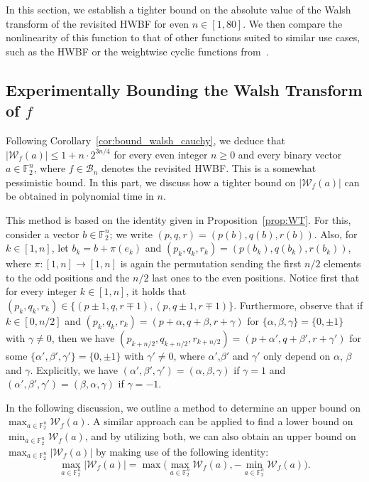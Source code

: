 \documentclass[runningheads,orivec]{llncs}
\newcommand{\BN}{\mathcal{B}_n}
\newcommand{\F}{\mathbb{F}}
\newcommand{\hwbf}{\textsf{HWBF}}
\newcommand{\wt}[1]{\mathcal W_{#1}}
\let\leq=\leqslant
\let\geq=\geqslant
\begin{document}
    In this section, we establish a tighter bound on the absolute value of the Walsh transform of the revisited \hwbf{} for even $n\in[1,80]$. We then compare the nonlinearity of this function to that of other functions suited to similar use cases, such as the \hwbf{} or the weightwise cyclic functions from~\cite{DAM:MeaOza24}.
    
    \subsection{Experimentally Bounding the Walsh Transform of $f$}\label{sec:expwt}
    
    Following Corollary~\ref{cor:bound_walsh_cauchy}, we deduce that $|\wt f(a)|\leq 1+n\cdot 2^{3n/4}$ for every even integer $n\geq 0$ and every binary vector $a\in\F_2^n$, where $f\in\BN$ denotes the revisited \hwbf{}. This is a somewhat pessimistic bound. In this part, we discuss how a tighter bound on $|\wt f(a)|$ can be obtained in polynomial time in $n$.
    
    This method is based on the identity given in Proposition~\ref{prop:WT}.
    For this, consider a vector $b\in\mathbb F_2^n$; we write $(p,q,r)=(p(b),q(b),r(b))$. Also, for $k\in[1,n]$, let $b_k=b+\pi(e_k)$ and $(p_k,q_k,r_k)=(p(b_k),q(b_k),r(b_k))$, where $\pi:[1,n]\to[1,n]$ is again the permutation sending the first $n/2$ elements to the odd positions and the $n/2$ last ones to the even positions. Notice first that for every integer $k\in[1,n]$, it holds that $(p_k,q_k,r_k)\in\{(p\pm1,q,r\mp 1),(p,q\pm 1,r\mp 1)\}$. Furthermore, observe that if $k\in[0,n/2]$ and $(p_k,q_k,r_k)=(p+\alpha,q+\beta,r+\gamma)$ for $\{\alpha,\beta,\gamma\}=\{0,\pm 1\}$ with $\gamma\neq 0$, then we have $(p_{k+n/2},q_{k+n/2},r_{k+n/2})=(p+\alpha',q+\beta',r+\gamma')$ for some $\{\alpha',\beta',\gamma'\}=\{0,\pm 1\}$ with $\gamma'\neq 0$, where $\alpha'$,$\beta'$ and $\gamma'$ only depend on $\alpha$, $\beta$ and $\gamma$. Explicitly, we have $(\alpha',\beta',\gamma')=(\alpha,\beta,\gamma)$ if $\gamma=1$ and $(\alpha',\beta',\gamma')=(\beta,\alpha,\gamma)$ if $\gamma=-1$.
    
    In the following discussion, we outline a method to determine an upper bound on $\max_{a\in\F_2^n}\wt f(a)$. A similar approach can be applied to find a lower bound on $\min_{a\in\F_2^n}\wt f(a)$, and by utilizing both, we can also obtain an upper bound on $\max_{a\in\F_2^n}|\wt f(a)|$ by making use of the following identity:
    \[
    	\max_{a\in\F_2^n}|\wt f(a)|=\max\Big(\max_{a\in\F_2^n}\wt f(a),-\min_{a\in\F_2^n}\wt f(a)\Big).
    \]
    
\end{document}
